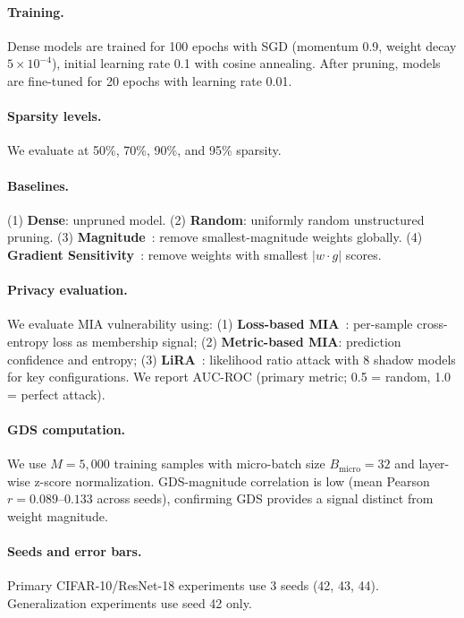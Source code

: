 \documentclass{article}
\begin{document}
\paragraph{Training.} Dense models are trained for 100 epochs with SGD (momentum 0.9, weight decay $5 \times 10^{-4}$), initial learning rate 0.1 with cosine annealing. After pruning, models are fine-tuned for 20 epochs with learning rate 0.01.

\paragraph{Sparsity levels.} We evaluate at 50\%, 70\%, 90\%, and 95\% sparsity.

\paragraph{Baselines.} (1) \textbf{Dense}: unpruned model. (2) \textbf{Random}: uniformly random unstructured pruning. (3) \textbf{Magnitude}~\citep{han2015learning}: remove smallest-magnitude weights globally. (4) \textbf{Gradient Sensitivity}~\citep{molchanov2019importance}: remove weights with smallest $|w \cdot g|$ scores.

\paragraph{Privacy evaluation.} We evaluate MIA vulnerability using: (1) \textbf{Loss-based MIA}~\citep{yeom2018privacy}: per-sample cross-entropy loss as membership signal; (2) \textbf{Metric-based MIA}: prediction confidence and entropy; (3) \textbf{LiRA}~\citep{carlini2022membership}: likelihood ratio attack with 8 shadow models for key configurations. We report AUC-ROC (primary metric; 0.5 = random, 1.0 = perfect attack).

\paragraph{GDS computation.} We use $M = 5{,}000$ training samples with micro-batch size $B_{\text{micro}} = 32$ and layer-wise z-score normalization. GDS-magnitude correlation is low (mean Pearson $r = 0.089$--$0.133$ across seeds), confirming GDS provides a signal distinct from weight magnitude.

\paragraph{Seeds and error bars.} Primary CIFAR-10/ResNet-18 experiments use 3 seeds (42, 43, 44). Generalization experiments use seed 42 only.
\end{document}
